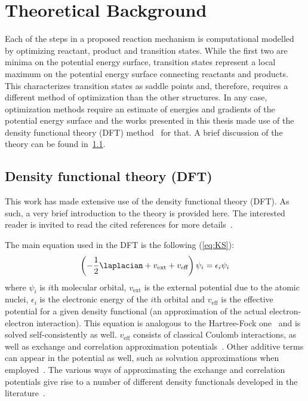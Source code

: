 \section{Theoretical Background}%
\label{sec:background-methods}


Each of the steps in a proposed reaction mechanism is computational modelled
by optimizing reactant, product and transition states.
While the first two are minima on the potential energy surface, transition
states represent a local maximum on the potential energy surface connecting
reactants and products.
This characterizes transition states as saddle points and, therefore, requires
a different method of optimization than the other structures.
In any case, optimization methods require an estimate of energies and gradients
of the potential energy surface and the works presented in this thesis made use
of the density functional theory (DFT)
method~\cite{Hohenberg_1964,Kohn_1965,Perdew_2014,Kryachko_2014,Yu_2016} for
that.
A brief discussion of the theory can be found in~\cref{sec:dft}.

\subsection{Density functional theory (DFT)}\label{sec:dft}

This work has made extensive use of the density functional theory (DFT).
As such, a very brief introduction to the theory is provided here.
The interested reader is invited to read the cited references for more
details~\cite{Hohenberg_1964,Kohn_1965}.

The main equation used in the DFT is the following (\cref{eq:KS}):
%
\begin{equation}
  \left(-\frac{1}{2} \laplacian
  + v_\text{ext}
  + v_\text{eff}
  \right) \psi_i
  = \epsilon_i \psi_i
  \label{eq:KS}
\end{equation}
%
where $\psi_i$ is $i$th molecular orbital, $v_\text{ext}$ is the external
potential due to the atomic nuclei, $\epsilon_i$ is the electronic energy
of the $i$th orbital and $v_\text{eff}$ is the effective potential for a given
density functional (an approximation of the actual electron-electron
interaction).
This equation is analogous to the Hartree-Fock one~\cite{Szabo_1996}
and is solved self-consistently as well.
$v_\text{eff}$ consists of classical Coulomb interactions, as well as exchange
and correlation approximation
potentials~\cite{Perdew_2014,Kryachko_2014,Yu_2016}.
Other additive terms can appear in the potential as well, such as solvation
approximations when employed~\cite{Marenich_2009,Marenich_2012}.
The various ways of approximating the exchange and correlation potentials give
rise to a number of different density functionals developed in the
literature~\cite{Chai_2008a,Chai_2008b,Goerigk_2011,Arago_2011,Salzner_2011,Burns_2011,Minenkov_2012,DFT2016_poll}.


